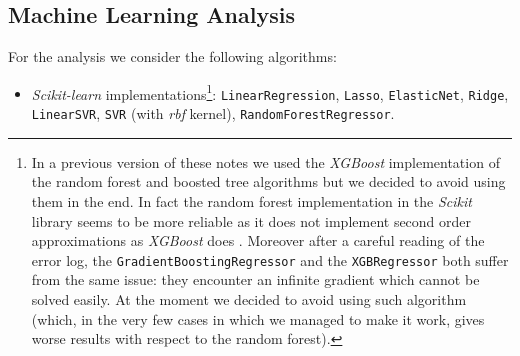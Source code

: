 \subsection{Machine Learning Analysis}
    For the analysis we consider the following algorithms:
    \begin{itemize}
        \item \textit{Scikit-learn} implementations\footnote{In a previous version of these notes we used the \textit{XGBoost} implementation of the random forest and boosted tree algorithms but we decided to avoid using them in the end. In fact the random forest implementation in the \textit{Scikit} library seems to be more reliable as it does not implement second order approximations as \textit{XGBoost} does \cite[documentation of]{Chen:2016:XST:2939672.2939785}. Moreover after a careful reading of the error log, the \texttt{GradientBoostingRegressor} and the \texttt{XGBRegressor} both suffer from the same issue: they encounter an infinite gradient which cannot be solved easily. At the moment we decided to avoid using such algorithm (which, in the very few cases in which we managed to make it work, gives worse results with respect to the random forest).}:
            \subitem \texttt{LinearRegression},
            \subitem \texttt{Lasso},
            \subitem \texttt{ElasticNet},
            \subitem \texttt{Ridge},
            \subitem \texttt{LinearSVR},
            \subitem \texttt{SVR} (with \textit{rbf} kernel),
            \subitem \texttt{RandomForestRegressor}.
    \end{itemize}
